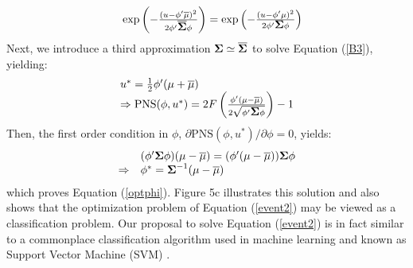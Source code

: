 \documentclass[12pt]{article}
\newcommand{\Sig}{\mbox{\boldmath \(\Sigma\)}}
\newcommand{\PNS}{\textrm{PNS}}
\begin{document}
\begin{appendix}[B]
\begin{equation}
\begin{array}{ll}
\label{B3}
&\exp\left(-\frac{(u-\phi'\overline{\mu})^2}{2\phi'\overline{\Sig} \phi}\right)=\exp\left(-\frac{(u-\phi'\mu)^2}{2\phi'\Sig \phi}\right)\\
\end{array}
\end{equation}
Next, we introduce a third approximation $\Sig\simeq\overline{\Sig}$ to solve Equation (\ref{B3}),  yielding:
\begin{equation}
\begin{array}{ll}
u^*=\frac{1}{2}\phi'(\mu+\overline{\mu})\\
\Rightarrow \PNS(\phi,u^*)=2F\left(\frac{\phi'(\mu-\overline{\mu})}{2\sqrt{\phi'\Sig \phi}}\right)-1
\end{array}
\end{equation}
Then, the first order condition in $\phi$, $\partial \PNS(\phi,u^*)/\partial \phi =0$,  yields:
\begin{equation}
\begin{array}{ll}
&(\phi'\Sig \phi)(\mu-\overline{\mu})=(\phi'(\mu-\overline{\mu}))\Sig \phi\\
\Rightarrow&\phi^*=\Sig^{-1}(\mu-\overline{\mu})\\
\end{array}
\end{equation}
which proves Equation (\ref{optphi}). Figure 5c illustrates this solution and also shows that the optimization problem of Equation (\ref{event2}) may be viewed as a classification problem. Our proposal to solve Equation (\ref{event2}) is in fact  similar to a commonplace classification algorithm used in machine learning and known as Support Vector Machine (SVM) \citep{CoV95}.
\end{appendix}
\end{document}

